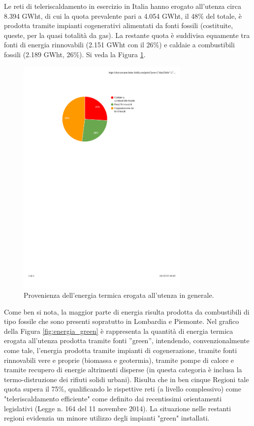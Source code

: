 \documentclass[laurea,oneside,11pt]{USiena_tesiLM3}
\begin{document}
Le reti di teleriscaldamento in esercizio in Italia hanno erogato all'utenza circa 8.394 GWht, di cui la quota prevalente pari a 4.054 GWht, il 48\% del totale, è prodotta tramite impianti cogenerativi alimentati da fonti fossili (costituite, queste, per la quasi totalità da gas). La restante quota è suddivisa equamente tra fonti di energia rinnovabili (2.151 GWht con il 26\%) e caldaie a combustibili fossili (2.189 GWht, 26\%). Si veda la Figura \ref{fig:torta}.

\begin{figure}[!ht]
\centering
\includegraphics[width=0.75\textwidth]{figure/torta_energia} 
\caption{Provenienza dell'energia termica erogata all'utenza in generale.}
\label{fig:torta}
\end{figure}

Come ben si nota, la maggior parte di energia risulta prodotta da combustibili di tipo fossile che sono presenti sopratutto in Lombardia e Piemonte.
Nel grafico della Figura \ref{fig:energia_green} è rappresenta la quantità di energia termica erogata all'utenza prodotta tramite fonti ''green'', intendendo, convenzionalmente come tale, l'energia prodotta tramite impianti di cogenerazione, tramite fonti rinnovabili vere e proprie (biomassa e geotermia), tramite pompe di calore e tramite recupero di energie altrimenti disperse (in questa categoria è inclusa la termo-distruzione dei rifiuti solidi urbani).
Risulta che in ben cinque Regioni tale quota supera il 75\%, qualificando le rispettive reti (a livello complessivo) come "teleriscaldamento efficiente" come definito dai recentissimi orientamenti legislativi (Legge n. 164 del 11 novembre 2014).
La situazione nelle restanti regioni evidenzia un minore utilizzo degli impianti "green" installati.
\end{document}
